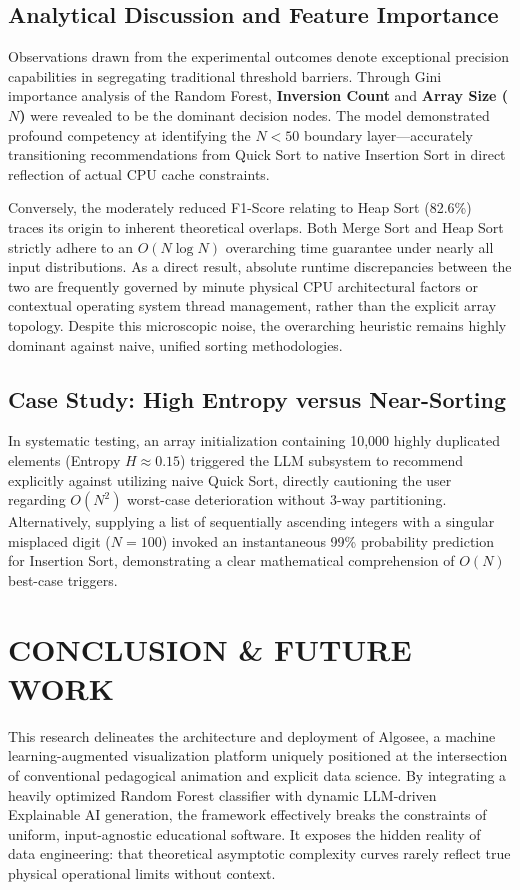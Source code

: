 \documentclass[conference]{IEEEtran}
\begin{document}
\subsection{Analytical Discussion and Feature Importance}
Observations drawn from the experimental outcomes denote exceptional precision capabilities in segregating traditional threshold barriers. Through Gini importance analysis of the Random Forest, \textbf{Inversion Count} and \textbf{Array Size ($N$)} were revealed to be the dominant decision nodes. The model demonstrated profound competency at identifying the $N < 50$ boundary layer---accurately transitioning recommendations from Quick Sort to native Insertion Sort in direct reflection of actual CPU cache constraints.

Conversely, the moderately reduced F1-Score relating to Heap Sort (82.6\%) traces its origin to inherent theoretical overlaps. Both Merge Sort and Heap Sort strictly adhere to an $O(N \log N)$ overarching time guarantee under nearly all input distributions. As a direct result, absolute runtime discrepancies between the two are frequently governed by minute physical CPU architectural factors or contextual operating system thread management, rather than the explicit array topology. Despite this microscopic noise, the overarching heuristic remains highly dominant against naive, unified sorting methodologies.

\subsection{Case Study: High Entropy versus Near-Sorting}
In systematic testing, an array initialization containing 10,000 highly duplicated elements (Entropy $H \approx 0.15$) triggered the LLM subsystem to recommend explicitly against utilizing naive Quick Sort, directly cautioning the user regarding $O(N^2)$ worst-case deterioration without 3-way partitioning. Alternatively, supplying a list of sequentially ascending integers with a singular misplaced digit ($N=100$) invoked an instantaneous 99\% probability prediction for Insertion Sort, demonstrating a clear mathematical comprehension of $O(N)$ best-case triggers.

\section{CONCLUSION \& FUTURE WORK}
This research delineates the architecture and deployment of Algosee, a machine learning-augmented visualization platform uniquely positioned at the intersection of conventional pedagogical animation and explicit data science. By integrating a heavily optimized Random Forest classifier with dynamic LLM-driven Explainable AI generation, the framework effectively breaks the constraints of uniform, input-agnostic educational software. It exposes the hidden reality of data engineering: that theoretical asymptotic complexity curves rarely reflect true physical operational limits without context.
\end{document}
